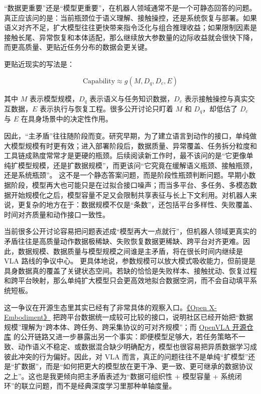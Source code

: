 “数据更重要”还是“模型更重要”，在机器人领域通常不是一个可静态回答的问题。真正应该问的是：当前瓶颈位于语义理解、接触操控，还是系统恢复与部署。如果语义对齐不足，扩大模型往往更快带来指令泛化与组合推理收益；如果限制因素是接触长尾、异常恢复和本体适配，那么继续放大参数量的边际收益就会很快下降，而更高质量、更贴近任务分布的数据会更关键。

更贴近现实的写法是：

\begin{equation*}
\text{Capability} \approx g(M, D_q, D_c, E)
\end{equation*}

其中 \(M\) 表示模型规模，\(D_q\) 表示语义与任务知识数据，\(D_c\) 表示接触操控与真实交互数据，\(E\) 表示执行与恢复工程。很多公开讨论只盯着 \(M\) 和 \(D_q\)，却低估了 \(D_c\) 与 \(E\) 在具身场景中的决定性作用。

因此，“主矛盾”往往随阶段而变。研究早期，为了建立语言到动作的接口，单纯做大模型规模有时更有效；进入部署阶段后，数据质量、异常覆盖、任务拆分粒度和工具链成熟度常常才是更硬的瓶颈。后续阅读新工作时，最不该问的是“它更像单纯扩模型规模，还是扩数据规模”，而更该问“它究竟在缓解语义瓶颈、接触瓶颈，还是系统瓶颈”。 这不是一个静态答案问题，而是阶段性瓶颈判断问题。早期小数据阶段，模型再大也可能只是在过拟合接口噪声；而当多平台、多任务、多模态数据开始规模化之后，模型容量不足又会限制共享表征与长上下文利用。对机器人来说，更复杂的地方在于：数据规模不仅是“条数”，还包括平台多样性、失败覆盖、时间对齐质量和动作接口一致性。

当前很多公开讨论容易把问题表述成“模型再大一点就行”，但机器人领域更真实的矛盾往往是高质量动作数据极稀缺、失败恢复数据更稀缺、跨平台对齐更难。因此，数据规模、数据质量与模型规模之间谁是主矛盾，将在很长时间内继续是 VLA 路线的争议中心。 更具体地说，参数规模可以放大模式吸收能力，但前提是具身数据真的覆盖了关键状态空间。若缺的恰恰是失败样本、接触扰动、恢复过程和跨平台映射，那么单纯扩大模型只会更高效地拟合数据空洞，而不会自动填平系统短板。

这一争议在开源生态里其实已经有了非常具体的观察入口。\href{https://arxiv.org/abs/2310.08864}{《Open X-Embodiment》} 把跨平台数据统一成较可比较的接口，说明社区已经开始把“数据规模”理解为“跨本体、跨任务、跨采集协议的可对齐规模”；而 \href{https://github.com/openvla/openvla}{OpenVLA 开源仓库} 的公开链路又进一步暴露出另一个事实：即便模型足够大，若任务策略不一致、动作语义不稳定、或数据混合缺少明确配方，模型也很容易把异质数据学习成彼此冲突的行为偏好。因此，对 VLA 而言，真正的问题往往不是单纯“扩模型”还是“扩数据”，而是“如何把更大的模型放在更干净、更一致、更可继承的数据协议之上”。这也是我更倾向把主矛盾表述为“数据可组织性 + 模型容量 + 系统闭环”的联立问题，而不是经典深度学习里那种单轴度量。

